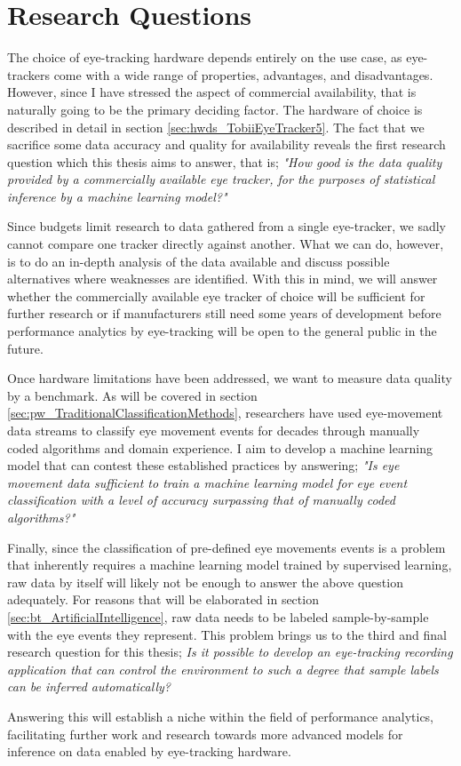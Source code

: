 \section{Research Questions} \label{sec:intro_research}

The choice of eye-tracking hardware depends entirely on the use case, as eye-trackers come with a wide range of properties, advantages, and disadvantages. However, since I have stressed the aspect of commercial availability, that is naturally going to be the primary deciding factor. The hardware of choice is described in detail in section \ref{sec:hwds_TobiiEyeTracker5}. The fact that we sacrifice some data accuracy and quality for availability reveals the first research question which this thesis aims to answer, that is; \textit{"How good is the data quality provided by a commercially available eye tracker, for the purposes of statistical inference by a machine learning model?"}

Since budgets limit research to data gathered from a single eye-tracker, we sadly cannot compare one tracker directly against another. What we can do, however, is to do an in-depth analysis of the data available and discuss possible alternatives where weaknesses are identified. With this in mind, we will answer whether the commercially available eye tracker of choice will be sufficient for further research or if manufacturers still need some years of development before performance analytics by eye-tracking will be open to the general public in the future.

Once hardware limitations have been addressed, we want to measure data quality by a benchmark. As will be covered in section \ref{sec:pw_TraditionalClassificationMethods}, researchers have used eye-movement data streams to classify eye movement events for decades through manually coded algorithms and domain experience. I aim to develop a machine learning model that can contest these established practices by answering; \textit{"Is eye movement data sufficient to train a machine learning model for eye event classification with a level of accuracy surpassing that of manually coded algorithms?"} 

Finally, since the classification of pre-defined eye movements events is a problem that inherently requires a machine learning model trained by supervised learning, raw data by itself will likely not be enough to answer the above question adequately. For reasons that will be elaborated in section \ref{sec:bt_ArtificialIntelligence}, raw data needs to be labeled sample-by-sample with the eye events they represent. This problem brings us to the third and final research question for this thesis; \textit{Is it possible to develop an eye-tracking recording application that can control the environment to such a degree that sample labels can be inferred automatically?} 

Answering this will establish a niche within the field of performance analytics, facilitating further work and research towards more advanced models for inference on data enabled by eye-tracking hardware.